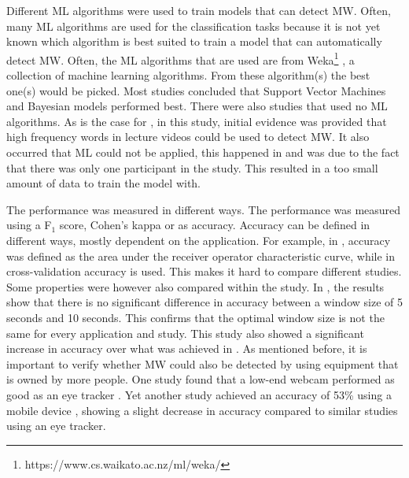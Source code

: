 Different ML algorithms were used to train models that can detect MW. Often, many ML algorithms are used for the classification tasks because it is not yet known which algorithm is best suited to train a model that can automatically detect MW. Often, the ML algorithms that are used are from Weka\footnote{https://www.cs.waikato.ac.nz/ml/weka/} \cite{Bixler2015AutomaticPhysiology}\cite{Bixler2015AutomaticAwareness}\cite{Bixler2016AutomaticReadingd}\cite{Bixler2014TowardWanderingd}\cite{Blanchard2014AutomatedLearning}\cite{Gwizdka2019ExploringTasks}\cite{Hutt2017OutClassroom}\cite{Pham2015Attentivelearner:Tracking}, a collection of machine learning algorithms. From these algorithm(s) the best one(s) would be picked. Most studies concluded that Support Vector Machines and Bayesian models performed best. There were also studies that used no ML algorithms. As is the case for \cite{Jo2017AMind}, in this study, initial evidence was provided that high frequency words in lecture videos could be used to detect MW. It also occurred that ML could not be applied, this happened in \cite{Gontier2016HowEnvironment} and was due to the fact that there was only one participant in the study. This resulted in a too small amount of data to train the model with.

The performance was measured in different ways. The performance was measured using a F$_1$ score, Cohen's kappa or as accuracy. Accuracy can be defined in different ways, mostly dependent on the application. For example, in \cite{Cheetham2016AutomatedApplication}, accuracy was defined as the area under the receiver operator characteristic curve, while in \cite{Mishchenko2015DetectingTespiti} cross-validation accuracy is used. This makes it hard to compare different studies. Some properties were however also compared within the study. In \cite{Gwizdka2019ExploringTasks}, the results show that there is no significant difference in accuracy between a window size of 5 seconds and 10 seconds. This confirms that the optimal window size is not the same for every application and study. This study also showed a significant increase in accuracy over what was achieved in \cite{Bixler2014TowardWanderingd}. As mentioned before, it is important to verify whether MW could also be detected by using equipment that is owned by more people. One study found that a low-end webcam performed as good as an eye tracker \cite{Zhao2017ScalableApproach}. Yet another study achieved an accuracy of 53\% using a mobile device \cite{ISI:000443429900018}, showing a slight decrease in accuracy compared to similar studies using an eye tracker.
